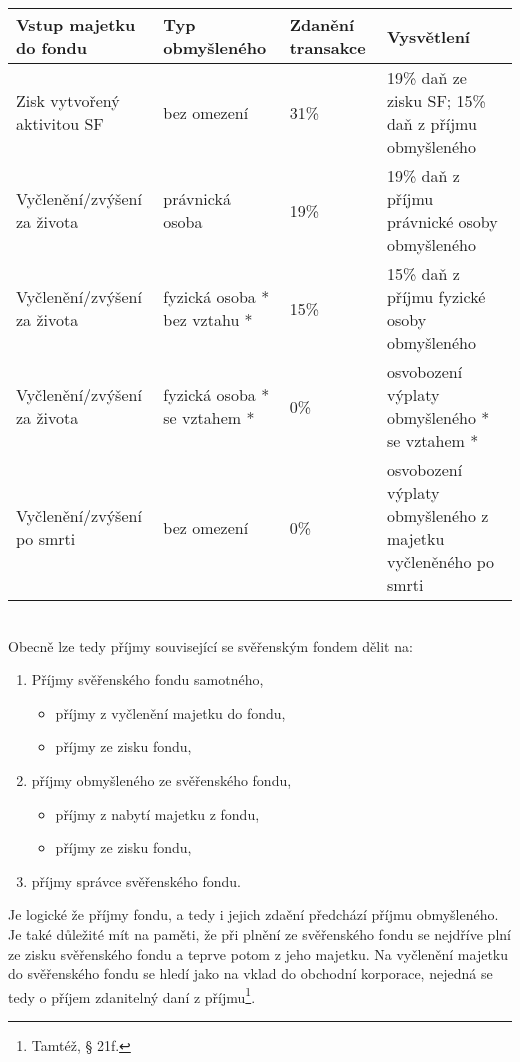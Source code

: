 \documentclass{article}
\begin{document}
 \noindent\begin{tabularx}{\textwidth}{|X|X|X|X|}
\hline
\textbf{Vstup majetku do fondu} & \textbf{Typ obmyšleného} & \textbf{Zdanění transakce} & \textbf{Vysvětlení}\\
\hline
Zisk vytvořený aktivitou SF & bez omezení & 31\% & 19\% daň ze zisku SF; 15\% daň z příjmu obmyšleného \\
\hline
Vyčlenění/zvýšení za života & právnická osoba & 19\% & 19\% daň z příjmu právnické osoby obmyšleného \\
\hline
Vyčlenění/zvýšení za života & fyzická osoba * bez vztahu * & 15\% & 	15\% daň z příjmu fyzické osoby obmyšleného \\
\hline
Vyčlenění/zvýšení za života & fyzická osoba * se vztahem * & 0\% & osvobození výplaty obmyšleného * se vztahem *\\
\hline
Vyčlenění/zvýšení po smrti & bez omezení & 0\% & 	osvobození výplaty obmyšleného z majetku vyčleněného po smrti \\
\hline
\end{tabularx}\\

Obecně lze tedy příjmy související se svěřenským fondem dělit na:\\

\begin{enumerate}
\item Příjmy svěřenského fondu samotného,
\begin{itemize}
\item příjmy z vyčlenění majetku do fondu,
\item příjmy ze zisku fondu,	
\end{itemize}
\item příjmy obmyšleného ze svěřenského fondu,
\begin{itemize}
\item příjmy z nabytí majetku z fondu,
\item příjmy ze zisku fondu,	
\end{itemize}
\item příjmy správce svěřenského fondu.	
\end{enumerate}

Je logické že příjmy fondu, a tedy i jejich zdaění předchází příjmu obmyšleného. Je také důležité mít na paměti, že při plnění ze svěřenského fondu se nejdříve plní ze zisku svěřenského fondu a teprve potom z jeho majetku. Na vyčlenění majetku do svěřenského fondu se hledí jako na vklad do obchodní korporace, nejedná se tedy o příjem zdanitelný daní z příjmu\footnote{Tamtéž, § 21f.}.\\
\end{document}
